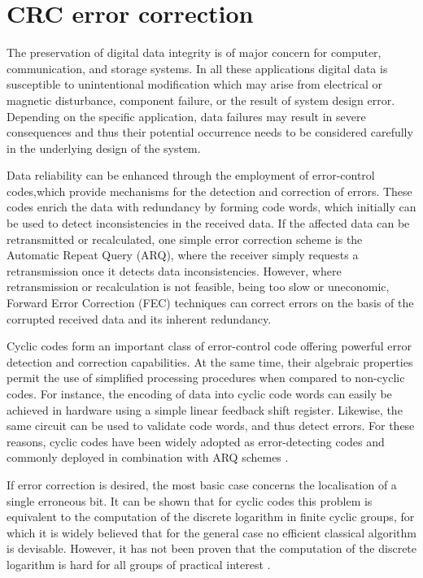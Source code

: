 \documentclass[a4paper, 11pt]{article}
\begin{document}
\clearpage
\section{CRC error correction}
\label{sec:crc}

The preservation of digital data integrity is of major concern for computer, communication, and storage systems. In all these applications digital data is susceptible to unintentional modification which may arise from electrical or magnetic disturbance, component failure, or the result of system design error. Depending on the specific application, data failures may result in severe consequences and thus their potential occurrence needs to be considered carefully in the underlying design of the system.

Data reliability can be enhanced through the employment of error-control codes,which provide mechanisms for the detection and correction of errors. These codes enrich the data with redundancy by forming code words, which initially can be used to detect inconsistencies in the received data. If the affected data can be retransmitted or recalculated, one simple error correction scheme is the Automatic Repeat Query (ARQ), where the receiver simply requests a retransmission once it detects data inconsistencies. However, where retransmission or recalculation is not feasible, being too slow or uneconomic, Forward Error Correction (FEC) techniques can correct errors on the basis of the corrupted received data and its inherent redundancy.

Cyclic codes form an important class of error-control code offering powerful error detection and correction capabilities. At the same time, their algebraic properties permit the use of simplified processing procedures when compared to non-cyclic codes. For instance, the encoding of data into cyclic code words can easily be achieved in hardware using a simple linear feedback shift register. Likewise, the same circuit can be used to validate code words, and thus detect errors. For these reasons, cyclic codes have been widely adopted as error-detecting codes and commonly deployed in combination with ARQ schemes \citep{grymel2013error}. 

If error correction is desired, the most basic case concerns the localisation of a single erroneous bit. It can be shown that for cyclic codes this problem is equivalent to the computation of the discrete logarithm in finite cyclic groups, for which it is widely believed that for the general case no efficient classical algorithm is devisable. However, it has not been proven that the computation of the discrete logarithm is hard for all groups of practical interest \citep{grymel2013error}.
\end{document}
